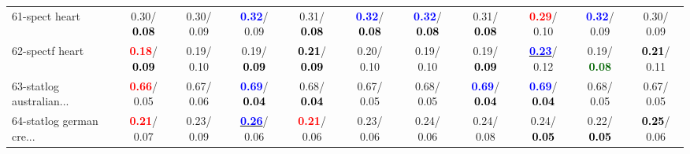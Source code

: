 \begin{table}[h]
\begin{center}
{\begin{tabular}{lc|c|c|c|c|c|c|c|c|c}
61-spect heart &   0.30/\textcolor{black}{\textbf{  0.08}} &   0.30/  0.09 & \textcolor{blue}{\textbf{  0.32}}/  0.09 &   0.31/\textcolor{black}{\textbf{  0.08}} & \textcolor{blue}{\textbf{  0.32}}/\textcolor{black}{\textbf{  0.08}} & \textcolor{blue}{\textbf{  0.32}}/\textcolor{black}{\textbf{  0.08}} &   0.31/\textcolor{black}{\textbf{  0.08}} & \textcolor{red}{\textbf{  0.29}}/  0.10 & \textcolor{blue}{\textbf{  0.32}}/  0.09 &   0.30/  0.09 \\
62-spectf heart & \textcolor{red}{\textbf{  0.18}}/\textcolor{black}{\textbf{  0.09}} &   0.19/  0.10 &   0.19/\textcolor{black}{\textbf{  0.09}} & \textcolor{black}{\textbf{  0.21}}/\textcolor{black}{\textbf{  0.09}} &   0.20/  0.10 &   0.19/  0.10 &   0.19/\textcolor{black}{\textbf{  0.09}} & \underline{\textcolor{blue}{\textbf{  0.23}}}/  0.12 &   0.19/\textcolor{darkgreen}{\textbf{  0.08}} & \textcolor{black}{\textbf{  0.21}}/  0.11 \\
63-statlog australian... & \textcolor{red}{\textbf{  0.66}}/  0.05 &   0.67/  0.06 & \textcolor{blue}{\textbf{  0.69}}/\textcolor{black}{\textbf{  0.04}} &   0.68/\textcolor{black}{\textbf{  0.04}} &   0.67/  0.05 &   0.68/  0.05 & \textcolor{blue}{\textbf{  0.69}}/\textcolor{black}{\textbf{  0.04}} & \textcolor{blue}{\textbf{  0.69}}/\textcolor{black}{\textbf{  0.04}} &   0.68/  0.05 &   0.67/  0.05 \\
64-statlog german cre... & \textcolor{red}{\textbf{  0.21}}/  0.07 &   0.23/  0.09 & \underline{\textcolor{blue}{\textbf{  0.26}}}/  0.06 & \textcolor{red}{\textbf{  0.21}}/  0.06 &   0.23/  0.06 &   0.24/  0.06 &   0.24/  0.08 &   0.24/\textcolor{black}{\textbf{  0.05}} &   0.22/\textcolor{black}{\textbf{  0.05}} & \textcolor{black}{\textbf{  0.25}}/  0.06 \\\end{tabular}}\label{stratsALCKappa1aRFRedux}
\end{center}
\end{table}

